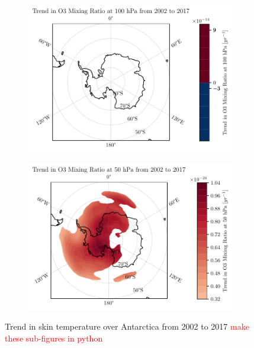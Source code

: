 \documentclass[../main.tex]{subfiles}
\begin{document}
\begin{figure}[!hbt]
\begin{subfigure}[b]{0.5\textwidth}
    \end{subfigure}
    \begin{subfigure}[b]{0.5\textwidth}
    \includegraphics[width=\textwidth]{images/2021w5/chapter7/hres/trend_spatial_o3_100}
    \end{subfigure}
    \begin{subfigure}[b]{0.5\textwidth}
    \includegraphics[width=\textwidth]{images/2021w5/chapter7/hres/trend_spatial_o3_50}
    \end{subfigure}
    \caption{Trend in skin temperature over Antarctica from 2002 to 2017 \textcolor{red}{make these sub-figures in python}}
    \label{fig:trend_skt_02_17}
\end{figure}
\end{document}
